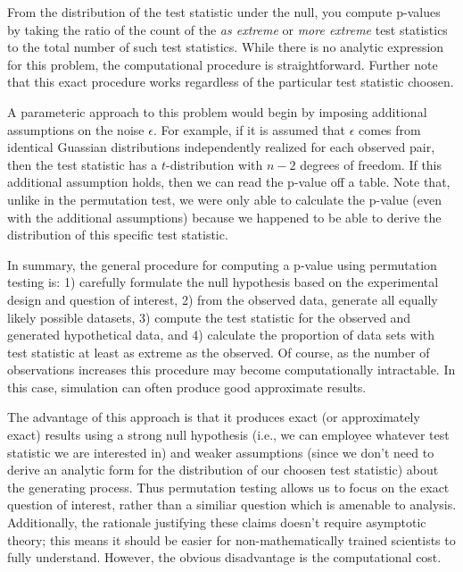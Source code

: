 From the distribution of the test statistic under the null, you compute
p-values by taking the ratio of the count of the \emph{as extreme} or
\emph{more extreme} test statistics to the total number of such test
statistics. While there is no analytic expression for this problem, the
computational procedure is straightforward.  Further note that this exact
procedure works regardless of the particular test statistic choosen.

A parameteric approach to this problem would begin by imposing additional
assumptions on the noise $\epsilon$.  For example, if it is assumed that
$\epsilon$ comes from identical Guassian distributions independently realized
for each observed pair, then the test statistic has a $t$-distribution with
$n-2$ degrees of freedom.  If this additional assumption holds, then we can read
the p-value off a table.  Note that, unlike in the permutation test, we were
only able to calculate the p-value (even with the additional assumptions)
because we happened to be able to derive the distribution of this specific
test statistic. 


In summary, the general procedure for computing a p-value using permutation
testing is: 1) carefully formulate the null hypothesis based on the
experimental design and question of interest, 2) from the observed data,
generate all equally likely possible datasets, 3) compute the test statistic
for the observed and generated hypothetical data, and 4) calculate the
proportion of data sets with test statistic at least as extreme as the
observed.  Of course, as the number of observations increases this procedure
may become computationally intractable.  In this case, simulation can often
produce good approximate results.

The advantage of this approach is that it produces exact (or approximately
exact) results using a strong null hypothesis (i.e., we can employee whatever
test statistic we are interested in) and weaker assumptions (since we don't
need to derive an analytic form for the distribution of our choosen test
statistic) about the generating process. Thus permutation testing allows us to
focus on the exact question of interest, rather than a similiar question which
is amenable to analysis.  Additionally, the rationale justifying these claims
doesn't require asymptotic theory; this means it should be easier for
non-mathematically trained scientists to fully understand.  However, the
obvious disadvantage is the computational cost.


